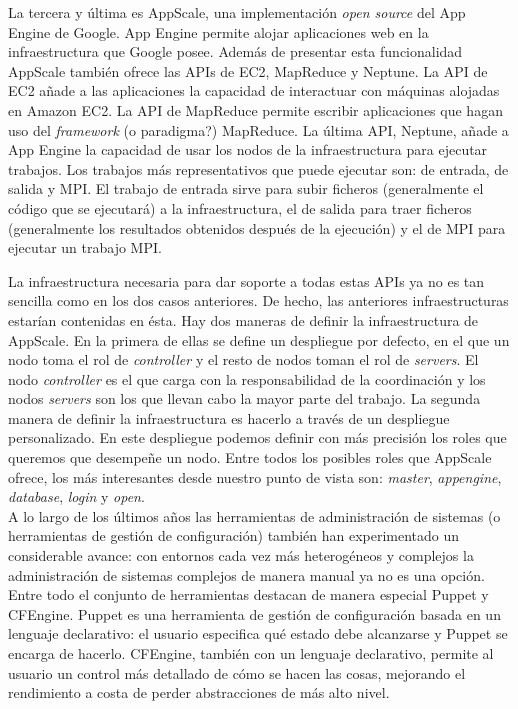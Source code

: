 La tercera y última es AppScale, una implementación \emph{open source} del App Engine de Google. App Engine permite alojar aplicaciones web en la infraestructura que Google posee. Además de presentar esta funcionalidad AppScale también ofrece las APIs de EC2, MapReduce y Neptune. La API de EC2 añade a las aplicaciones la capacidad de interactuar con máquinas alojadas en Amazon EC2. La API de MapReduce permite escribir aplicaciones que hagan uso del \emph{framework} (o paradigma?) MapReduce. La última API, Neptune, añade a App Engine la capacidad de usar los nodos de la infraestructura para ejecutar trabajos. Los trabajos más representativos que puede ejecutar son: de entrada, de salida y MPI. El trabajo de entrada sirve para subir ficheros (generalmente el código que se ejecutará) a la infraestructura, el de salida para traer ficheros (generalmente los resultados obtenidos después de la ejecución) y el de MPI para ejecutar un trabajo MPI.

La infraestructura necesaria para dar soporte a todas estas APIs ya no es tan sencilla como en los dos casos anteriores. De hecho, las anteriores infraestructuras estarían contenidas en ésta. Hay dos maneras de definir la infraestructura de AppScale. En la primera de ellas se define un despliegue por defecto, en el que un nodo toma el rol de \emph{controller} y el resto de nodos toman el rol de \emph{servers}. El nodo \emph{controller} es el que carga con la responsabilidad de la coordinación y los nodos \emph{servers} son los que llevan cabo la mayor parte del trabajo. La segunda manera de definir la infraestructura es hacerlo a través de un despliegue personalizado. En este despliegue podemos definir con más precisión los roles que queremos que desempeñe un nodo. Entre todos los posibles roles que AppScale ofrece, los más interesantes desde nuestro punto de vista son: \emph{master}, \emph{appengine}, \emph{database}, \emph{login} y \emph{open}.\\

A lo largo de los últimos años las herramientas de administración de sistemas (o herramientas de gestión de configuración) también han experimentado un considerable avance: con entornos cada vez más heterogéneos y complejos la administración de sistemas complejos de manera manual ya no es una opción. Entre todo el conjunto de herramientas destacan de manera especial Puppet y CFEngine. Puppet es una herramienta de gestión de configuración basada en un lenguaje declarativo: el usuario especifica qué estado debe alcanzarse y Puppet se encarga de hacerlo. CFEngine, también con un lenguaje declarativo, permite al usuario un control más detallado de cómo se hacen las cosas, mejorando el rendimiento a costa de perder abstracciones de más alto nivel.

